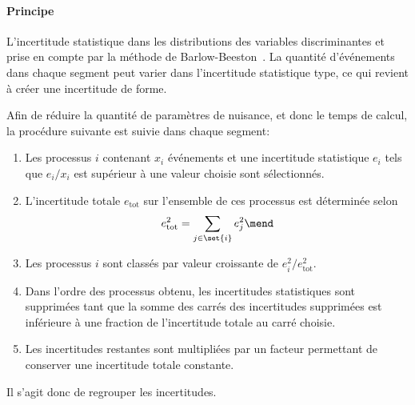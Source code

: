 \paragraph{Principe}
L'incertitude statistique dans les distributions des variables discriminantes et prise en compte par la méthode de Barlow-Beeston~\cite{BarlowBeeston,BarlowBeeston2}.
La quantité d'événements dans chaque segment peut varier dans l'incertitude statistique type, ce qui revient à créer une incertitude de forme.
\par
Afin de réduire la quantité de paramètres de nuisance, et donc le temps de calcul, la procédure suivante est suivie dans chaque segment:
\begin{enumerate}
\item Les processus $i$ contenant $x_i$ événements et une incertitude statistique $e_i$ tels que $e_i/x_i$ est supérieur à une valeur  choisie sont sélectionnés.
\item L'incertitude totale $e_\text{tot}$ sur l'ensemble de ces processus est déterminée selon
\begin{equation}
e_\text{tot}^2 = \sum_{j\in\set{i}} e_j^2
\mend
\end{equation}
\item Les processus $i$ sont classés par valeur croissante de $e_i^2/e_\text{tot}^2$.
\item Dans l'ordre des processus obtenu, les incertitudes statistiques sont supprimées tant que la somme des carrés des incertitudes supprimées est inférieure à une fraction de l'incertitude totale au carré  choisie.
\item Les incertitudes restantes sont multipliées par un facteur permettant de conserver une incertitude totale constante.
\end{enumerate}
Il s'agit donc de regrouper les incertitudes.
